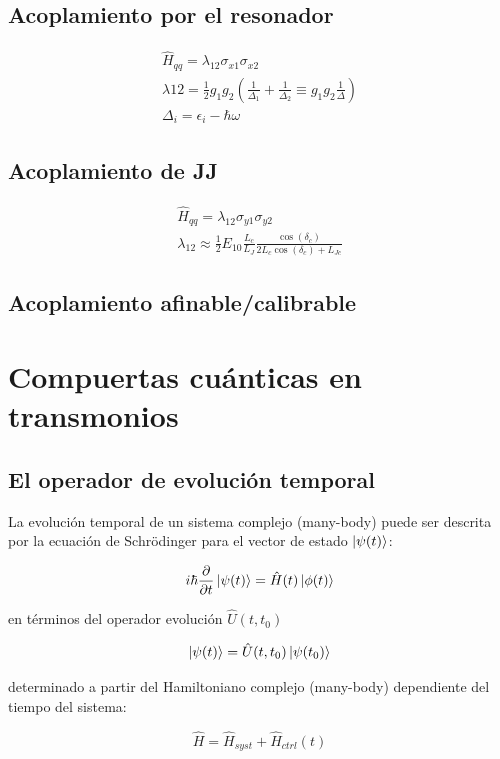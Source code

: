 \documentclass[11pt, spanish]{report}
\begin{document}
\subsection{Acoplamiento por el resonador}
\begin{align*}
\hat{H}_{qq} = \lambda_{1 2} \sigma_{x1} \sigma_{x2} \\
\lambda{1 2} = \frac{1}{2} g_1 g_2 (\frac{1}{\Delta_1} + \frac{1}{\Delta_2} \equiv g_1 g_2 \frac{1}{\Delta}) \\
\Delta_i = \epsilon_i - \hbar \omega
\end{align*}

\subsection{Acoplamiento de JJ}
\begin{align*}
\hat{H}_{qq} = \lambda_{1 2} \sigma_{y1} \sigma_{y2} \\
\lambda_{1 2} \approx \frac{1}{2} E_{1 0} \frac{L_c}{L_J} \frac{\cos(\delta_c)}{2L_c \cos(\delta_c) + L_{J c}}
\end{align*}

\subsection{Acoplamiento afinable/calibrable}

\section{Compuertas cuánticas en transmonios}

\subsection{El operador de evolución temporal}
La evolución temporal de un sistema complejo (many-body) puede ser descrita por la ecuación de Schrödinger para el vector de estado $\ket{\psi(t)}$:

\[
i \hbar \frac{\partial}{\partial t} \ket{\psi(t)} = \hat{H}(t) \ket{\phi(t)}
\]

en términos del operador evolución $\hat{U}(t,t_0)$

\[
\ket{\psi(t)} = \hat{U}(t,t_0) \ket{\psi(t_0)}
\]

determinado a partir del Hamiltoniano complejo (many-body) dependiente del tiempo del sistema:

\[
\hat{H} = \hat{H}_{syst} + \hat{H}_{ctrl}(t)
\]
\end{document}
